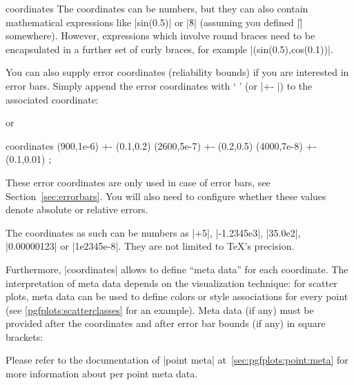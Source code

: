 {\begin{addplotoperation}[]{coordinates}{}
The coordinates can be numbers, but they can also contain mathematical
expressions like |sin(0.5)| or |\h*8| (assuming you defined |\h| somewhere).
However, expressions which involve round braces need to be encapsulated in a
further set of curly braces, for example |({sin(0.5)},{cos(0.1)})|.

You can also supply error coordinates (reliability bounds) if you are
interested in error bars. Simply append the error coordinates with
`\declareandlabel{+-} ' (or |+- |) to the associated
coordinate:
%
\begin{codeexample}[]
\end{codeexample}
%
or
%
\begin{codeexample}
\addplot coordinates {
     (900,1e-6) +- (0.1,0.2)
    (2600,5e-7) +- (0.2,0.5)
    (4000,7e-8) +- (0.1,0.01)
};
\end{codeexample}
%
These error coordinates are only used in case of error bars, see
Section~\ref{sec:errorbars}. You will also need to configure whether these
values denote absolute or relative errors.

The coordinates as such can be numbers as |+5|, |-1.2345e3|, |35.0e2|,
|0.00000123| or |1e2345e-8|. They are not limited to \TeX's precision.

Furthermore, |coordinates| allows to define ``meta data'' for each coordinate.
The interpretation of meta data depends on the visualization technique: for
scatter plots, meta data can be used to define colors or style associations for
every point (see \ref{pgfplots:scatterclasses} for an example). Meta
data (if any) must be provided after the coordinates and after error bar bounds
(if any) in square brackets:
%
\begin{codeexample}[]
\end{codeexample}
%
Please refer to the documentation of |point meta| at~\ref{sec:pgfplots:point:meta} for more information about per point meta
data.


\end{addplotoperation}}

